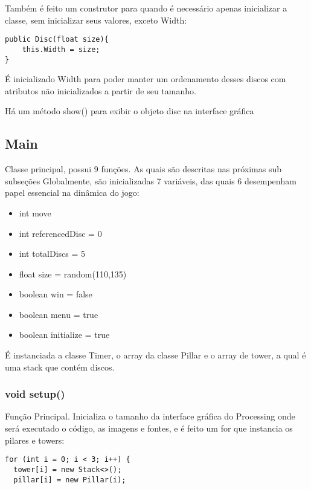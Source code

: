 \documentclass[
	12pt,				%
	oneside,			%
	a4paper,			%
	english,			%
	brazil,				%
	]{abntex2}
\begin{document}
{Também é feito um construtor para quando é necessário apenas inicializar a classe, sem inicializar seus valores, exceto Width:

\begin{itshape}
\begin{verbatim}
public Disc(float size){
    this.Width = size;
}
\end{verbatim}
\end{itshape}
É inicializado Width para poder manter um ordenamento desses discos com atributos não inicializados a partir de seu tamanho.

Há um método show() para exibir o objeto disc na interface gráfica

\subsection{Main}
Classe principal, possui 9 funções. As quais são descritas nas próximas sub subseções Globalmente, são inicializadas 7 variáveis, das quais 6 desempenham papel essencial na dinâmica do jogo:

\begin{itemize}
    \item int move
    \item int referencedDisc = 0
    \item int totalDiscs = 5
    \item float size = random(110,135)
    \item boolean win = false
    \item boolean menu = true
    \item boolean initialize = true
    \end{itemize}

É instanciada a classe Timer, o array da classe Pillar e o array de tower, a qual é uma stack que contém discos.
\subsubsection{void setup()}
Função Principal. Inicializa o tamanho da interface gráfica do Processing onde será executado o código, as imagens e fontes, e é feito um for que instancia os pilares e towers:

\begin{itshape}
\begin{verbatim}
for (int i = 0; i < 3; i++) {
  tower[i] = new Stack<>();
  pillar[i] = new Pillar(i);
\end{verbatim}
\end{itshape}
}
\end{document}
